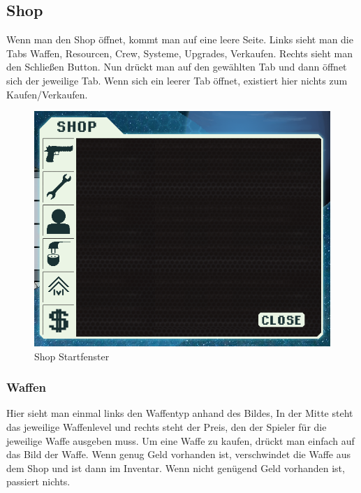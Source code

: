 \documentclass[fontsize=12pt,paper=a4,twoside]{scrartcl}
\begin{document}
\subsection{Shop}

Wenn man den Shop öffnet, kommt man auf eine leere Seite. Links sieht man die Tabs Waffen, Resourcen, Crew, Systeme, Upgrades, Verkaufen. Rechts sieht man den Schließen Button. Nun drückt man auf den gewählten Tab und dann öffnet sich der jeweilige Tab. Wenn sich ein leerer Tab öffnet, existiert hier nichts zum Kaufen/Verkaufen. 

\begin{figure}[H]
\centering
\includegraphics[width=1\linewidth]{DasSpiel/Shop/shop.png}
\caption{Shop Startfenster}
\end{figure}

\subsubsection{Waffen}

Hier sieht man einmal links den Waffentyp anhand des Bildes, In der Mitte steht das jeweilige Waffenlevel und rechts steht der Preis, den der Spieler für die jeweilige Waffe ausgeben muss. Um eine Waffe zu kaufen, drückt man einfach auf das Bild der Waffe. Wenn genug Geld vorhanden ist, verschwindet die Waffe aus dem Shop und ist dann im Inventar. Wenn nicht genügend Geld vorhanden ist, passiert nichts. 
\end{document}
